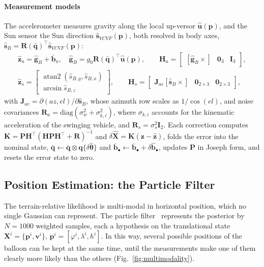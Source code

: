 \documentclass[preprint,12pt,a4paper]{elsarticle}
\begin{document}
\paragraph{Measurement models}
The accelerometer measures gravity along the local up-versor $\hat{\mathbf{u}}(\mathbf{p})$, and
the Sun sensor the Sun direction $\hat{\mathbf{s}}_{VCVF}(\mathbf{p})$, both resolved in body
axes, $\hat{\mathbf{s}}_B=\mathbf{R}(\bar{\mathbf{q}})^\top\hat{\mathbf{s}}_{VCVF}(\mathbf{p})$:
\begin{gather}
\hat{\mathbf{z}}_a=\hat{\mathbf{g}}_B+\bar{\mathbf{b}}_a,\quad
\hat{\mathbf{g}}_B=g_0\mathbf{R}(\bar{\mathbf{q}})^\top\hat{\mathbf{u}}(\mathbf{p}),\qquad
\mathbf{H}_a=\begin{bmatrix}[\hat{\mathbf{g}}_B\times] & \mathbf{0}_3 & \mathbf{I}_3
\end{bmatrix},\\
\hat{\mathbf{z}}_s=\begin{bmatrix}\operatorname{atan2}(\hat s_{B,y},\hat s_{B,x})\\
\arcsin\hat s_{B,z}\end{bmatrix},\qquad
\mathbf{H}_s=\begin{bmatrix}\mathbf{J}_{ae}[\hat{\mathbf{s}}_B\times] &
\mathbf{0}_{2\times3} & \mathbf{0}_{2\times3}\end{bmatrix},
\end{gather}
with $\mathbf{J}_{ae}=\partial(az,el)/\partial\hat{\mathbf{s}}_B$, whose azimuth row scales as
$1/\cos(el)$, and noise covariances $\mathbf{R}_a=\mathrm{diag}(\sigma_w^2+\sigma_{k,i}^2)$,
where $\sigma_{k,i}$ accounts for the kinematic acceleration of the swinging vehicle, and
$\mathbf{R}_s=\sigma_s^2\mathbf{I}_2$.
Each correction computes $\mathbf{K}=\mathbf{P}\mathbf{H}^\top(\mathbf{H}\mathbf{P}
\mathbf{H}^\top+\mathbf{R})^{-1}$ and $\delta\hat{\mathbf{X}}=\mathbf{K}(\mathbf{z}-
\hat{\mathbf{z}})$, folds the error into the nominal state,
$\bar{\mathbf{q}}\leftarrow\bar{\mathbf{q}}\otimes\mathbf{q}\{\delta\hat{\boldsymbol{\theta}}\}$
and $\bar{\mathbf{b}}_\bullet\leftarrow\bar{\mathbf{b}}_\bullet+\delta\hat{\mathbf{b}}_\bullet$,
updates $\mathbf{P}$ in Joseph form, and resets the error state to zero.

\subsection{Position Estimation: the Particle Filter}

The terrain-relative likelihood is multi-modal in horizontal position, which no single
Gaussian can represent.
The particle filter~\cite{Gordon1993,Arulampalam2002} represents the posterior by $N=1000$
weighted samples, each a hypothesis on the translational state
$\mathbf{X}^i=\{\mathbf{p}^i,\mathbf{v}^i\}$, $\mathbf{p}^i=[\varphi^i,\lambda^i,h^i]$.
In this way, several possible positions of the balloon can be kept at the same time, until
the measurements make one of them clearly more likely than the others
(Fig.~\ref{fig:multimodality}).
\end{document}
